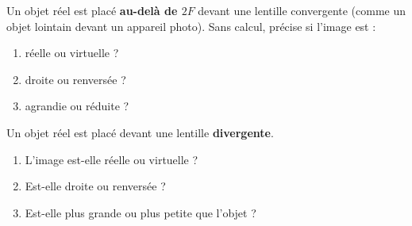 \documentclass[11pt,a4paper]{article}
\begin{document}
\begin{exo}
Un objet réel est placé \textbf{au-delà de $2F$} devant une lentille convergente (comme un objet
lointain devant un appareil photo). Sans calcul, précise si l'image est :
\begin{enumerate}[label=\alph*)]
  \item réelle ou virtuelle ?
  \item droite ou renversée ?
  \item agrandie ou réduite ?
\end{enumerate}
\end{exo}

\begin{exo}
Un objet réel est placé devant une lentille \textbf{divergente}.
\begin{enumerate}[label=\alph*)]
  \item L'image est-elle réelle ou virtuelle ?
  \item Est-elle droite ou renversée ?
  \item Est-elle plus grande ou plus petite que l'objet ?
\end{enumerate}
\end{exo}
\end{document}
